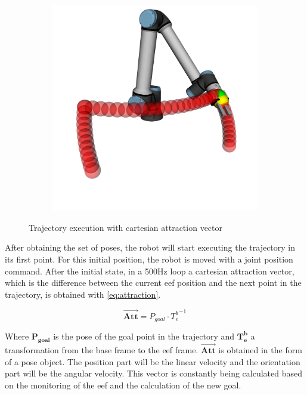 \begin{figure}[h]
\begin{subfigure}{.2\linewidth}
    \end{subfigure}%
    \begin{subfigure}{.2\linewidth}
        \centering
        \includegraphics[width=\linewidth]{figs/chp4/trajectory_4.png}
    \end{subfigure}
    \caption{Trajectory execution with cartesian attraction vector}
    \label{fig:attraction}
\end{figure}

\par After obtaining the set of poses, the robot will start executing the trajectory in its first point. For this initial position, the robot is moved with a joint position command. After the initial state, in a 500Hz loop a cartesian attraction vector, which is the difference between the current \ac{eef} position and the next point in the trajectory, is obtained with \autoref{eq:attraction}.

\begin{equation}
    \vec{\mathbf{Att}}=P_{goal}\cdot {T_e^b}^{-1}
    \label{eq:attraction}
\end{equation}

\noindent Where $\mathbf{P_{goal}}$ is the pose of the goal point in the trajectory and $\mathbf{T_e^b}$ a transformation from the base frame to the \ac{eef} frame. $\vec{\mathbf{Att}}$ is obtained in the form of a pose object. The position part will be the linear velocity and the orientation part will be the angular velocity. This vector is constantly being calculated based on the monitoring of the \ac{eef} and the calculation of the new goal.

